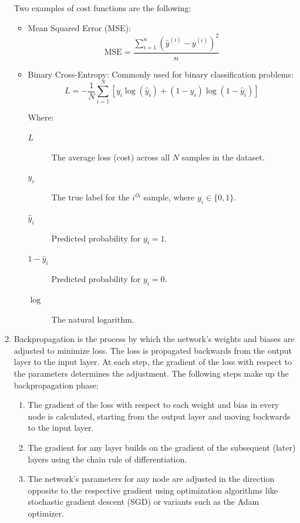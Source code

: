 \begin{enumerate}[label=\Roman*.]
			\bigskip
			Two examples of cost functions are the following:
			\begin{itemize}
				\item Mean Squared Error (MSE):
				\begin{equation}
					\text{MSE} = \frac{\sum_{i=1}^n (\hat{y}^{(i)} - y^{(i)})^2}{n}
				\end{equation}

				
				\item Binary Cross-Entropy:
				Commonly used for binary classification problems:
				\begin{equation}
					L = -\frac{1}{N} \sum_{i=1}^N \left[ y_i \log(\hat{y}_i) + (1 - y_i) \log(1 - \hat{y}_i) \right]
				\end{equation}

				\bigskip
				Where:
				\begin{description}
					\item[$L$] The average loss (cost) across all $N$ samples in the dataset.
					\item[$y_i$] The true label for the $i^{th}$ sample, where $y_i \in \{0, 1\}$.
					\item[$\hat{y}_i$] Predicted probability for $y_i = 1$.
					\item[$1 - \hat{y}_i$] Predicted probability for $y_i = 0$.
					\item[$\log$] The natural logarithm.
				\end{description}
				\bigskip

			\end{itemize}
			\bigskip
			
			\item Backpropagation is the process by which the network's weights and biases are adjusted to minimize loss. The loss is propagated backwards from the output layer to the input layer. At each step, the gradient of the loss with respect to the parameters determines the adjustment. The following steps make up the backpropagation phase:
			
			\bigskip
			\begin{enumerate}
				\item The gradient of the loss with respect to each weight and bias in every node is calculated, starting from the output layer and moving backwards to the input layer.
				\item The gradient for any layer builds on the gradient of the subsequent (later) layers using the chain rule of differentiation.
				\item The network's parameters for any node are adjusted in the direction opposite to the respective gradient using optimization algorithms like stochastic gradient descent (SGD) or variants such as the Adam optimizer.
			\end{enumerate}
		\end{enumerate}


